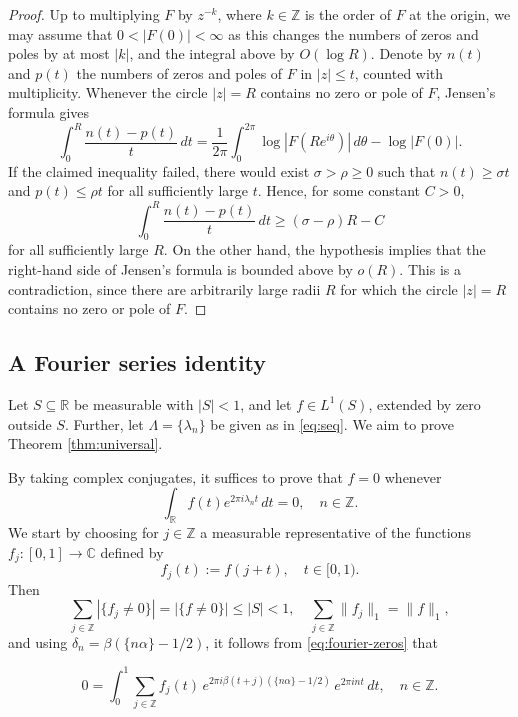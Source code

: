 \documentclass[reqno,a4paper,12pt]{amsart}
\numberwithin{equation}{section}
\def\Z{{\mathbb Z}}
\def\R{{\mathbb R}}
\def\C{{\mathbb C}}
\newcommand\1{\mathds{1}}
\begin{document}
\begin{proof}
Up to multiplying \(F\) by \(z^{-k}\), where \(k\in\Z\) is the order of
\(F\) at the origin, we may assume that \(0<|F(0)|<\infty\) as this
changes the numbers of zeros and poles by at most \(|k|\), and the
integral above by \(O(\log R)\).  Denote by
\(n(t)\) and \(p(t)\) the numbers of zeros and poles of \(F\) in
\(|z|\leq t\), counted with multiplicity.  Whenever the circle
\(|z|=R\) contains no zero or pole of \(F\), Jensen's
formula gives
\[
    \int_0^{R}\frac{n(t)-p(t)}{t}\,dt
    =\frac1{2\pi}\int_0^{2\pi}\log|F(R e^{i\theta})|\,d\theta
     -\log|F(0)|.
\]
If the claimed inequality failed, there would exist
\(\sigma>\rho\geq0\) such that \(n(t)\geq\sigma t\) and
\(p(t)\leq\rho t\) for all sufficiently large \(t\). Hence,
for some constant \(C>0\),
\[
    \int_0^R \frac{n(t)-p(t)}{t}\,dt
    \geq (\sigma-\rho)R-C
\]
for all sufficiently large \(R\). On the other hand, the hypothesis implies that the right-hand side of Jensen's formula is bounded above by \(o(R)\). This is a contradiction, since there are arbitrarily large radii \(R\) for which the circle
\(|z|=R\) contains no zero or pole of \(F\).
\end{proof}

\subsection{A Fourier series identity}
Let $S\subseteq\R$ be measurable with $|S|<1$, and let
$f\in L^1(S)$, extended by zero outside $S$. Further, let $\Lambda = \{ \lambda_n \}$ be given as in \eqref{eq:seq}. We aim to prove Theorem \ref{thm:universal}.

By taking complex conjugates, it suffices to prove that $f=0$ whenever
\begin{equation}\label{eq:fourier-zeros}
 \int_\R f(t)e^{2\pi i\lambda_nt}\,dt=0,
 \quad n\in\Z.
\end{equation}
We start by choosing for $j\in\Z$ a measurable representative of the functions $f_j : [0,1] \to \C$ defined by
\[
 f_j(t):=f(j+t), \quad t\in[0,1).
\]
Then
\begin{equation}\label{eq:layer-sums}
 \sum_{j \in \Z}|\{f_j\ne0\}|=|\{f\ne0\}|\leq|S|<1,
 \quad
 \sum_{j\in \Z}\|f_j\|_1=\|f\|_1,
\end{equation}
and using
$\delta_n=\beta(\{n\alpha\}-1/2)$, it follows from \eqref{eq:fourier-zeros} that

\begin{equation}\label{eq:sampling-identity}
 0 =\int_0^1\sum_{j \in \Z} f_j(t)\,
 e^{2\pi i\beta(t+j)(\{n\alpha\}-1/2)}\,
 e^{2\pi int}\,dt,
 \quad n\in\Z.
\end{equation}
\end{document}
